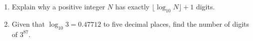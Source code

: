 \begin{enumerate}
\item[(a)] Explain why a positive integer $N$ has exactly $\lfloor\log_{10}N\rfloor+1$ digits.
\item[(b)] Given that $\log_{10}3=0.47712$ to five decimal places, find the number of digits of $3^{87}$.
\end{enumerate}
